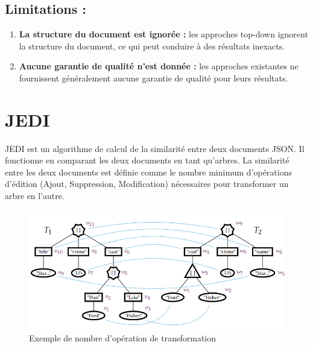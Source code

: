         \subsection{Limitations :}
            \begin{enumerate}
                \item \textbf{La structure du document est ignorée :} les approches top-down ignorent la structure du document, ce qui peut conduire à des résultats inexacts.
                \item \textbf{Aucune garantie de qualité n'est donnée :} les approches existantes ne fournissent généralement aucune garantie de qualité pour leurs résultats.
            \end{enumerate}

    \section{JEDI}
        JEDI \cite{JEDI} est un algorithme de calcul de la similarité entre deux documents JSON. Il fonctionne en comparant les deux documents en tant qu'arbres. La similarité entre les deux documents 
        est définie comme le nombre minimum d'opérations d'édition (Ajout, Suppression, Modification) nécessaires pour transformer un arbre en l'autre.
        \begin{figure}[H]
            \centering
            \includegraphics[scale=0.6]{Photos/Tree.png}
            \caption{Exemple de nombre d'opération de transformation\cite{JEDI}}

        \end{figure}
